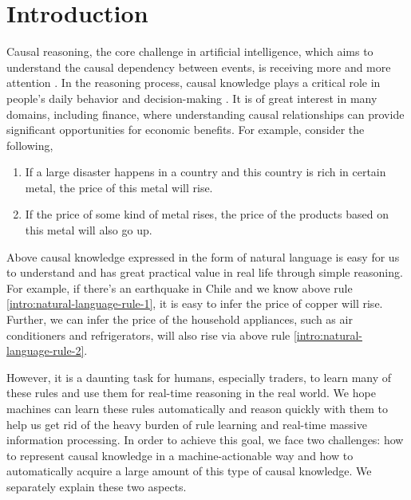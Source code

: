 \section{Introduction}
\label{sec:intro}
Causal reasoning, the core challenge in artificial intelligence, which aims to understand the causal dependency between events, is receiving more and more attention \cite{Pearl2009}.
In the reasoning process, causal knowledge plays a critical role in people's daily behavior and decision-making \cite{waldmann2013causal}.
It is of great interest in many domains, including finance, where understanding causal relationships can provide significant opportunities for economic benefits. 
For example, consider the following,
\begin{enumerate}
	\item If a large disaster happens in a country and this country is rich in certain metal, the price of this metal will rise. \label{intro:natural-language-rule-1}
	\item If the price of some kind of metal rises, the price of the products based on this metal will also go up. \label{intro:natural-language-rule-2}
\end{enumerate}
Above causal knowledge expressed in the form of natural language is easy for us to understand and has great practical value in real life through simple reasoning. For example, if there's an earthquake in Chile and we know above rule \ref{intro:natural-language-rule-1}, it is easy to infer the price of copper will rise. Further, we can infer the price of the household appliances, such as air conditioners and refrigerators, will also rise via above rule \ref{intro:natural-language-rule-2}.

However, it is a daunting task for humans, especially traders, to learn many of these rules and use them for real-time reasoning in the real world.  
We hope machines can learn these rules automatically and reason quickly with them to help us get rid of the heavy burden of rule learning and real-time massive information processing. 
In order to achieve this goal, we face two challenges: how to represent causal knowledge in a machine-actionable way and how to automatically acquire a large amount of this type of causal knowledge. We separately explain these two aspects.
	
